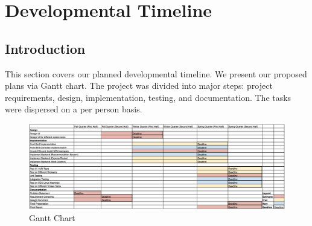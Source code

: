 \chapter{Developmental Timeline}

\section{Introduction}
This section covers our planned developmental timeline. We present our proposed plans via Gantt chart. The project was divided into major steps: project requirements, design, implementation, testing, and documentation. The tasks were dispersed on a per person basis. 

\begin{figure}[!ht]
	\centering
    \includegraphics[angle=270,scale=0.5]{developmentalTimeline}
    \caption{Gantt Chart}
\end{figure}